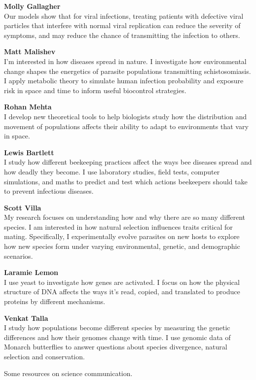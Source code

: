 \documentclass[10,portrait]{article}
\begin{document}
\textbf{Molly Gallagher}\\
Our models show that for viral infections, treating patients with
defective viral particles that interfere with normal viral replication
can reduce the severity of symptoms, and may reduce the chance of
transmitting the infection to others.

\textbf{Matt Malishev}\\
I'm interested in how diseases spread in nature. I investigate how
environmental change shapes the energetics of parasite populations
transmitting schistosomiasis. I apply metabolic theory to simulate human
infection probability and exposure risk in space and time to inform
useful biocontrol strategies.

\textbf{Rohan Mehta}\\
I develop new theoretical tools to help biologists study how the
distribution and movement of populations affects their ability to adapt
to environments that vary in space.

\textbf{Lewis Bartlett}\\
I study how different beekeeping practices affect the ways bee diseases
spread and how deadly they become. I use laboratory studies, field
tests, computer simulations, and maths to predict and test which actions
beekeepers should take to prevent infectious diseases.

\textbf{Scott Villa}\\
My research focuses on understanding how and why there are so many
different species. I am interested in how natural selection influences
traits critical for mating. Specifically, I experimentally evolve
parasites on new hosts to explore how new species form under varying
environmental, genetic, and demographic scenarios.

\textbf{Laramie Lemon}\\
I use yeast to investigate how genes are activated. I focus on how the
physical structure of DNA affects the ways it's read, copied, and
translated to produce proteins by different mechanisms.

\textbf{Venkat Talla}\\
I study how populations become different species by measuring the
genetic differences and how their genomes change with time. I use
genomic data of Monarch butterflies to answer questions about species
divergence, natural selection and conservation.

\newpage  

Some resources on science communication.
\end{document}
